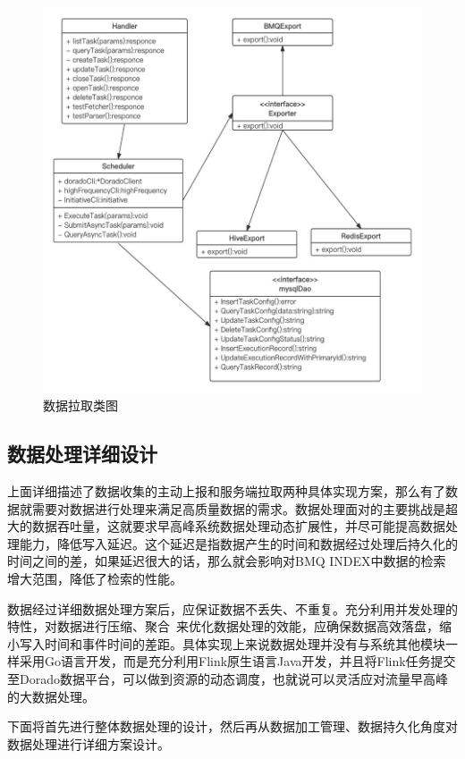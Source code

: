       \begin{figure}[htb]
  \centering
  \includegraphics[width=5in]{figure/chapter4/数据拉取类图.jpg}
  \caption{数据拉取类图}\label{shujulaquliucheng}
\end{figure}

\subsection{数据处理详细设计}
上面详细描述了数据收集的主动上报和服务端拉取两种具体实现方案，那么有了数据就需要对数据进行处理来满足高质量数据的需求。数据处理面对的主要挑战是超大的数据吞吐量，这就要求早高峰系统数据处理动态扩展性，并尽可能提高数据处理能力，降低写入延迟。这个延迟是指数据产生的时间和数据经过处理后持久化的时间之间的差，如果延迟很大的话，那么就会影响对BMQ INDEX中数据的检索增大范围，降低了检索的性能。

数据经过详细数据处理方案后，应保证数据不丢失、不重复。充分利用并发处理的特性，对数据进行压缩、聚合~\cite{jesus2014survey}来优化数据处理的效能，应确保数据高效落盘，缩小写入时间和事件时间的差距。具体实现上来说数据处理并没有与系统其他模块一样采用Go语言开发，而是充分利用Flink原生语言Java开发，并且将Flink任务提交至Dorado数据平台，可以做到资源的动态调度，也就说可以灵活应对流量早高峰的大数据处理。

下面将首先进行整体数据处理的设计，然后再从数据加工管理、数据持久化角度对数据处理进行详细方案设计。

